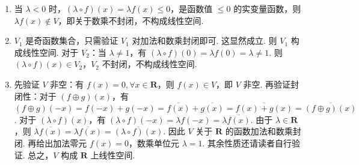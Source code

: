 \begin{exercise}
\begin{exgroup}
\begin{answer}
\begin{enumerate}
\begin{enumerate}
\begin{enumerate}
                                    \item \begin{align*}
                                                  & (\lambda+\mu)\cdot(a_1,\ldots,a_n)                         \\
                                              ={} & (a_1^{\mu+\lambda},\ldots,a_n^{\mu+\lambda})               \\
                                              ={} & (a_1^\lambda a_1^\mu,\ldots,a_n^\lambda a_n^\mu)           \\
                                              ={} & (a_1^\lambda,\ldots,a_n^\lambda)+(a_1^\mu,\ldots,a_n^\mu),
                                          \end{align*}
                                          因此 $(\lambda+\mu)\cdot(a_1,\ldots,a_n)=\lambda\cdot(a_1,\ldots,a_n)+\mu(a_1,\ldots,a_n)$，第一个加号为数的加法，第二个加号为定义的向量加法.

                                    \item $\lambda\cdot((a_1,\ldots,a_n)+(b_1,\ldots,b_n))=\lambda\cdot(a_1b_1,\ldots,a_nb_n)=(a_1^\lambda b_1^\lambda,\ldots,a_n^\lambda b_n^\lambda)=(a_1^\lambda,\ldots,a_n^\lambda)+(b_1^\lambda,\ldots,b_n^\lambda)$，因此 $\lambda\cdot((a_1,\ldots,a_n)+(b_1,\ldots,b_n))=\lambda\cdot(a_1,\ldots,a_n)+\lambda\cdot(b_1,\ldots,b_n)$.
                                \end{enumerate}
                                综上有 $\mathbf{R}_+^n$ 对如下加法和数乘构成实数域线性空间.
                      \end{enumerate}


                        \item 当 $\lambda<0$ 时，$(\lambda\circ f)(x)=\lambda f(x)\leqslant 0$，是函数值 $\le0$ 的实变量函数，则 $\lambda f(x)\not\in V$，即关于数乘不封闭，不构成线性空间.

                        \item $V_1$ 是奇函数集合，只需验证 $V_1$ 对加法和数乘封闭即可. 这显然成立. 则 $V_1$ 构成线性空间. 对于 $V_2$：当 $\lambda\neq 1$，有 $(\lambda\circ f)(0)=\lambda f(0)=\lambda\neq 1$. 则 $(\lambda\circ f)(x)\in V_2$，$V_2$ 不封闭，不构成线性空间.

                        \item 先验证 $V$ 非空：有 $f(x)=0,\forall x\in \mathbf{R}$，则 $f(x)\in V$，即 $V$ 非空. 再验证封闭性：对于 $(f\oplus g)(x)$，有 $(f\oplus g)(-x)=f(-x)+g(-x)=\overline{f(x)}+\overline{g(x)}=\overline{f(x)+g(x)}=\overline{(f\oplus g)(x)}$. 对于 $(\lambda\circ f)(x)$，有 $(\lambda\circ f)(-x)=\lambda f(-x)=\lambda\overline{f(x)}$. 由于 $\lambda \in \mathbf{R}$，则 $\lambda \overline{f(x)}=\overline{\lambda f(x)}=\overline{(\lambda\circ f)(x)}$. 因此 $V$ 关于 $\mathbf{R}$ 的函数加法和数乘封闭. 再给出加法零元 $f(x)=0$，数乘单位元 $\lambda=1$. 其余性质还请读者自行验证. 总之，$V$ 构成 $\mathbf{R}$ 上线性空间.
            \end{enumerate}
        \end{answer}


\end{exgroup}
\end{exercise}
